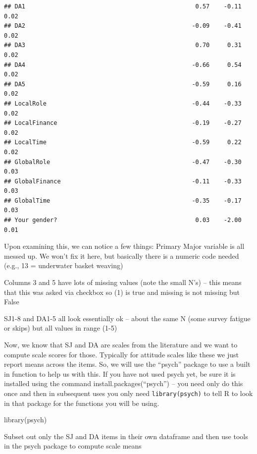 \documentclass[
]{book}
\newenvironment{Shaded}{\begin{snugshade}}{\end{snugshade}}
\newcommand{\FunctionTok}[1]{\textcolor[rgb]{0.00,0.00,0.00}{#1}}
\newcommand{\NormalTok}[1]{#1}
\begin{document}
\begin{verbatim}
## DA1                                                0.57    -0.11 0.02
## DA2                                               -0.09    -0.41 0.02
## DA3                                                0.70     0.31 0.02
## DA4                                               -0.66     0.54 0.02
## DA5                                               -0.59     0.16 0.02
## LocalRole                                         -0.44    -0.33 0.02
## LocalFinance                                      -0.19    -0.27 0.02
## LocalTime                                         -0.59     0.22 0.02
## GlobalRole                                        -0.47    -0.30 0.03
## GlobalFinance                                     -0.11    -0.33 0.03
## GlobalTime                                        -0.35    -0.17 0.03
## Your gender?                                       0.03    -2.00 0.01
\end{verbatim}

Upon examining this, we can notice a few things:
Primary Major variable is all messed up. We won't fix it here, but basically there is a numeric code needed (e.g., 13 = underwater basket weaving)

Columns 3 and 5 have lots of missing values (note the small N's) -- this means that this was asked via checkbox so (1) is true and missing is not missing but False

SJ1-8 and DA1-5 all look essentially ok -- about the same N (some survey fatigue or skips) but all values in range (1-5)

Now, we know that SJ and DA are scales from the literature and we want to compute scale scores for those. Typically for attitude scales like these we just report means across the items. So, we will use the ``psych'' package to use a built in function to help us with this. If you have not used psych yet, be sure it is installed using the command install.packages(``psych'') -- you need only do this once and then in subsequent uses you only need \texttt{library(psych)} to tell R to look in that package for the functions you will be using.

\begin{Shaded}
\begin{Highlighting}[]
\FunctionTok{library}\NormalTok{(psych)}
\end{Highlighting}
\end{Shaded}

Subset out only the SJ and DA items in their own dataframe and then use tools in the psych package to compute scale means
\end{document}
